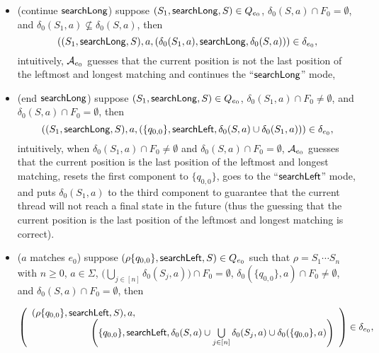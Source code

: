 \begin{itemize}
\begin{itemize}
		\item (continue $\mathsf{searchLong}$) suppose $(S_1, \mathsf{searchLong}, S) \in Q_{e_0}$, $\delta_0(S,a) \cap F_0 = \emptyset$, and $\delta_0(S_1,a) \not \subseteq \delta_0(S,a)$, then
		$$((S_1, \mathsf{searchLong}, S), a, (\delta_0(S_1,a), \mathsf{searchLong}, \delta_0(S,a))) \in \delta_{e_0},$$
		intuitively, $\mathcal{A}_{e_0}$ guesses that the current position is not the last position of the leftmost and longest matching and continues the ``$\mathsf{searchLong}$'' mode,
		\item (end $\mathsf{searchLong}$) suppose $(S_1, \mathsf{searchLong}, S) \in Q_{e_0}$, $\delta_0(S_1,a) \cap F_0 \neq \emptyset$, and $\delta_0(S,a) \cap F_0 = \emptyset$, then
		$$((S_1, \mathsf{searchLong}, S), a, (\{q_{0,0}\}, \mathsf{searchLeft}, \delta_0(S,a) \cup \delta_0(S_1,a))) \in \delta_{e_0},$$
		intuitively, when $\delta_0(S_1,a) \cap F_0 \neq \emptyset$ and $\delta_0(S,a) \cap F_0 = \emptyset$, $\mathcal{A}_{e_0}$ guesses that the current position is the last position of the leftmost and longest matching, resets the first component to $\{q_{0,0}\}$, goes to the ``$\mathsf{searchLeft}$'' mode, and puts $\delta_0(S_1, a)$ to the third component to guarantee that the current thread will not reach a final state in the future (thus the guessing that the current position is the last position of the leftmost and longest matching is correct).
		\item ($a$ matches $e_0$) suppose $(\rho \{q_{0,0}\}, \mathsf{searchLeft}, S) \in Q_{e_0}$ such that $\rho = S_1 \cdots S_n$ with $n \ge 0$,  $a \in \Sigma$, $\big(\bigcup \limits_{j \in [n]} \delta_0(S_j, a) \big) \cap F_0 = \emptyset$, $\delta_0(\{q_{0,0}\}, a) \cap F_0 \neq \emptyset$, and $\delta_0(S,a) \cap F_0 = \emptyset$, then

		\medskip
		$\left(
		\begin{array}{l l}
		(\rho \{q_{0,0}\}, \searchleft, S), a, &\\
		& \hspace{-2cm} \left(\{q_{0,0}\}, \searchleft, \delta_0(S,a) \cup \bigcup \limits_{j \in [n]} \delta_0(S_j, a) \cup \delta_0(\{q_{0,0}\}, a) \right)
		\end{array}
		\right) \in \delta_{e_0},$


\end{itemize}
\end{itemize}
